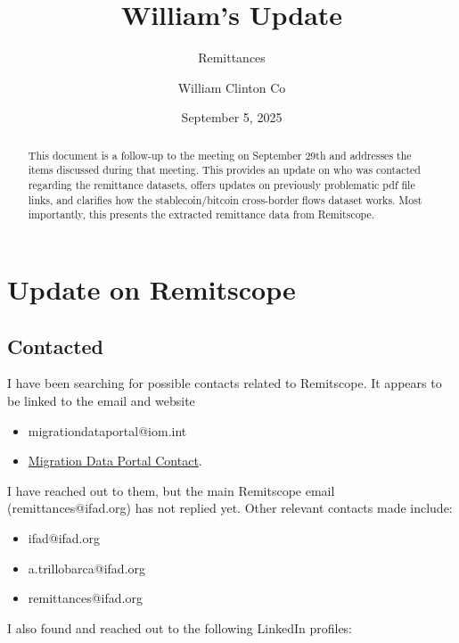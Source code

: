 \documentclass[
  11pt,
]{article}
\title{William's Update}
\subtitle{Remittances}
\author{William Clinton Co}
\date{September 5, 2025}
\providecommand{\tightlist}{%
  \setlength{\itemsep}{0pt}\setlength{\parskip}{0pt}}\usepackage{longtable,booktabs,array}
\renewcommand*\contentsname{Table of contents}
\newcommand\contentsname{Table of contents}
\begin{document}
\maketitle
\begin{abstract}
This document is a follow-up to the meeting on September 29th and
addresses the items discussed during that meeting. This provides an
update on who was contacted regarding the remittance datasets, offers
updates on previously problematic pdf file links, and clarifies how the
stablecoin/bitcoin cross-border flows dataset works. Most importantly,
this presents the extracted remittance data from Remitscope.
\end{abstract}

\renewcommand*\contentsname{Table of contents}
{
\hypersetup{linkcolor=}
\setcounter{tocdepth}{10}
\tableofcontents
}
\section{Update on Remitscope}\label{update-on-remitscope}

\subsection{Contacted}\label{contacted}

I have been searching for possible contacts related to Remitscope. It
appears to be linked to the email and website

\begin{itemize}
\tightlist
\item
  migrationdataportal@iom.int
\item
  \href{https://www.migrationdataportal.org/contact}{Migration Data
  Portal Contact}.
\end{itemize}

I have reached out to them, but the main Remitscope email
(remittances@ifad.org) has not replied yet. Other relevant contacts made
include:

\begin{itemize}
\tightlist
\item
  ifad@ifad.org
\item
  a.trillobarca@ifad.org
\item
  remittances@ifad.org
\end{itemize}

I also found and reached out to the following LinkedIn profiles:
\end{document}
